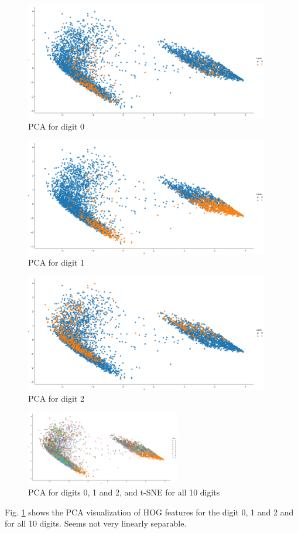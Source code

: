 \documentclass{article}
\begin{document}
\begin{figure}[H]
    \centering
    \begin{minipage}{0.32\textwidth}
        \centering
        \includegraphics[width=0.95\textwidth]{fig/pca/0.png}
        PCA for digit 0
    \end{minipage}
    \begin{minipage}{0.32\textwidth}
        \centering
        \includegraphics[width=0.95\textwidth]{fig/pca/1.png}
        PCA for digit 1
    \end{minipage}
    \begin{minipage}{0.32\textwidth}
        \centering
        \includegraphics[width=0.95\textwidth]{fig/pca/2.png}
        PCA for digit 2
    \end{minipage}
    \includegraphics[width=0.6\textwidth]{fig/pca/pca.png}
    \caption{PCA for digits 0, 1 and 2, and t-SNE for all 10 digits}
    \label{pca012}
\end{figure}
Fig. \ref{pca012} shows the PCA visualization of HOG features for the digit 0, 1 and 2 and for all 10 digits. Seems not very linearly separable.
\end{document}
